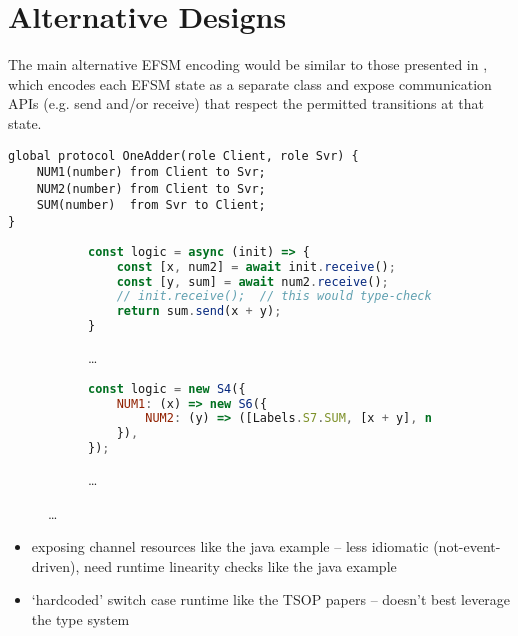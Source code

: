 \section{Alternative Designs}
\label{section:nodealt}

The main alternative EFSM encoding would be similar to those
presented in \cite{Hybrid2016}, which encodes
each EFSM state as a separate class and expose communication APIs
(e.g. send and/or receive) that respect the permitted transitions at
that state. 

\begin{lstlisting}[language=scribble]
global protocol OneAdder(role Client, role Svr) {
	NUM1(number) from Client to Svr;
	NUM2(number) from Client to Svr;
	SUM(number)  from Svr to Client;
}
\end{lstlisting}

\begin{figure}[!h]
\centering
\begin{subfigure}{\textwidth}
\begin{lstlisting}[language=javascript, tabsize=2]
const logic = async (init) => {
	const [x, num2] = await init.receive();
 	const [y, sum] = await num2.receive();
 	// init.receive();	// this would type-check but violate linearity
	return sum.send(x + y);
}
\end{lstlisting}
\caption{\dots}
\end{subfigure}
\hfill
\begin{subfigure}{\textwidth}
\begin{lstlisting}[language=javascript]
const logic = new S4({
	NUM1: (x) => new S6({
		NUM2: (y) => ([Labels.S7.SUM, [x + y], new S5()]),
	}),
});
\end{lstlisting}
\caption{\dots}
\end{subfigure}
\end{figure}

\begin{itemize}
\item exposing channel resources like the java example -- less idiomatic (not-event-driven), need runtime linearity checks like the java example
\item `hardcoded' switch case runtime like the TSOP papers -- doesn't best leverage the type system
\end{itemize}